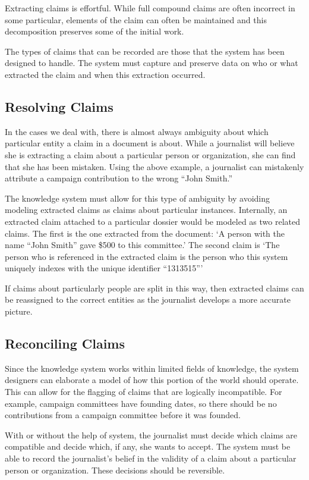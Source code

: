 \documentclass[format=siggraph, review=true]{acmart}
\begin{document}
Extracting claims is effortful. While full compound claims are often
incorrect in some particular, elements of the claim can often be
maintained and this decomposition preserves some of the initial work.

The types of claims that can be recorded are those that the system has
been designed to handle. The system must capture and preserve data on
who or what extracted the claim and when this extraction occurred.

\subsection{Resolving Claims}
In the cases we deal with, there is almost always ambiguity about
which particular entity a claim in a document is about. While a
journalist will believe she is extracting a claim about a particular
person or organization, she can find that she has been
mistaken. Using the above example, a journalist can mistakenly
attribute a campaign contribution to the wrong ``John Smith.''

The knowledge system must allow for this type of ambiguity by avoiding
modeling extracted claims as claims about particular
instances. Internally, an extracted claim attached to a particular
dossier would be modeled as two related claims. The first is the one
extracted from the document: `A person with the name ``John Smith''
gave \$500 to this committee.' The second claim is `The person who is
referenced in the extracted claim is the person who this system
uniquely indexes with the unique identifier ``1313515'''

If claims about particularly people are split in this way, then
extracted claims can be reassigned to the correct entities as the
journalist develops a more accurate picture.


\subsection{Reconciling Claims}
Since the knowledge system works within limited fields of knowledge,
the system designers can elaborate a model of how this portion of
the world should operate. This can allow for the flagging of claims
that are logically incompatible. For example, campaign committees have
founding dates, so there should be no contributions from a campaign
committee before it was founded. 

With or without the help of system, the journalist must decide which
claims are compatible and decide which, if any, she wants to
accept. The system must be able to record the journalist's belief in
the validity of a claim about a particular person or
organization. These decisions should be reversible.
\end{document}
